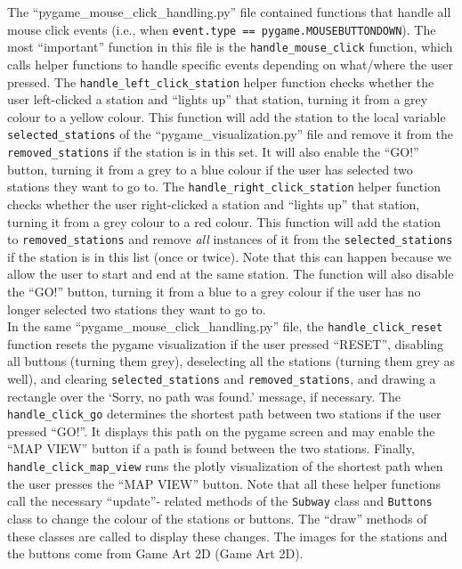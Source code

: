 \documentclass[fontsize=11pt]{article}
\begin{document}
The ``pygame\_mouse\_click\_handling.py” file contained functions that handle all mouse click events (i.e., when \texttt{event.type == pygame.MOUSEBUTTONDOWN}). The most ``important” function in this file is the \texttt{handle\_mouse\_click} function, which calls helper functions to handle specific events depending on what/where the user pressed. The \texttt{handle\_left\_click\_station} helper function checks whether the user left-clicked a station and ``lights up” that station, turning it from a grey colour to a yellow colour. This function will add the station to the local variable \texttt{selected\_stations} of the ``pygame\_visualization.py” file and remove it from the \texttt{removed\_stations} if the station is in this set. It will also enable the ``GO!” button, turning it from a grey to a blue colour if the user has selected two stations they want to go to.  The \texttt{handle\_right\_click\_station} helper function checks whether the user right-clicked a station and ``lights up” that station, turning it from a grey colour to a red colour. This function will add the station to \texttt{removed\_stations} and remove \textit{all} instances of it from the \texttt{selected\_stations} if the station is in this list (once or twice). Note that this can happen because we allow the user to start and end at the same station. The function will also disable the ``GO!” button, turning it from a blue to a grey colour if the user has no longer selected two stations they want to go to. \\

In the same ``pygame\_mouse\_click\_handling.py” file, the \texttt{handle\_click\_reset} function resets the pygame visualization if the user pressed ``RESET”, disabling all buttons (turning them grey), deselecting all the stations (turning them grey as well), and clearing \texttt{selected\_stations} and \texttt{removed\_stations}, and drawing a rectangle over the `Sorry, no path was found.’ message, if necessary. The \texttt{handle\_click\_go} determines the shortest path between two stations if the user pressed ``GO!”. It displays this path on the pygame screen and may enable the ``MAP VIEW” button if a path is found between the two stations. Finally, \texttt{handle\_click\_map\_view} runs the plotly visualization of the shortest path when the user presses the ``MAP VIEW” button. Note that all these helper functions call the necessary ``update”- related methods of the \texttt{Subway} class and \texttt{Buttons} class to change the colour of the stations or buttons. The ``draw” methods of these classes are called to display these changes. The images for the stations and the buttons come from Game Art 2D (Game Art 2D).
\end{document}
